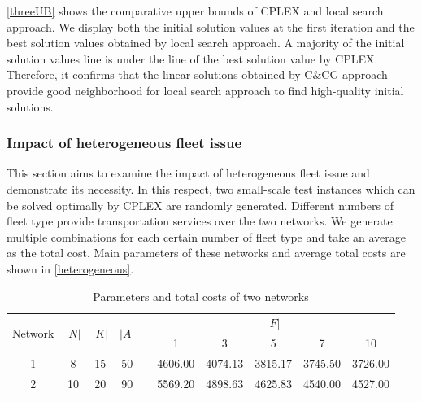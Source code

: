 \documentclass[11pt,nonblindrev,fleqn]{article}
\begin{document}
\autoref{threeUB} shows the comparative upper bounds of CPLEX and local search approach. We display both the initial solution values at the first iteration and the best solution values obtained by local search approach. A majority of the initial solution values line is under the line of the best solution value by CPLEX. Therefore, it confirms that the linear solutions obtained by C\&CG approach provide good neighborhood for local search approach to find high-quality initial solutions.

\subsubsection{Impact of heterogeneous fleet issue}
This section aims to examine the impact of heterogeneous fleet issue and demonstrate its necessity. In this respect, two small-scale test instances which can be solved optimally by CPLEX are randomly generated. Different numbers of fleet type provide transportation services over the two networks. We generate multiple combinations for each certain number of fleet type and take an average as the total cost. Main parameters of these networks and average total costs are shown in \autoref{heterogeneous}.

\begin{table}[H]
\setlength{\abovecaptionskip}{-3pt}
\setlength{\belowcaptionskip}{5pt}
\centering
  \footnotesize
  \caption{Parameters and total costs of two networks}
  \label{heterogeneous}

\begin{tabular}{cccccccccc}
\hline
\multirow{2}[4]{*}{Network} & \multirow{2}[4]{*}{$|N|$} & \multirow{2}[4]{*}{$|K|$} & \multirow{2}[4]{*}{$|A|$} &       & \multicolumn{5}{c}{$|F|$} \bigstrut\\
\cline{6-10}      &       &       &       &       & 1     & 3     & 5     & 7     & 10 \bigstrut\\
\hline
1     & 8     & 15    & 50    &       & 4606.00  & 4074.13  & 3815.17  & 3745.50  & 3726.00  \bigstrut[t]\\
2     & 10    & 20    & 90    &       & 5569.20  & 4898.63  & 4625.83  & 4540.00  & 4527.00  \bigstrut[b]\\
\hline
\end{tabular}%

\end{table}%
\end{document}
